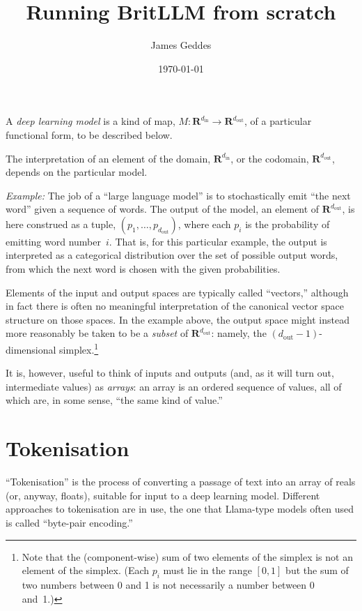 \documentclass[11pt, a4paper]{article}
\title{Running BritLLM from scratch}
\author{James Geddes}
\date{\today}
\newcommand{\setR}{\mathbold{R}}
\begin{document}
\maketitle

A \emph{deep learning model} is a kind of map,
$M\colon \setR^{d_\text{in}} \to \setR^{d_\text{out}}$, of a particular
functional form, to be described below.

The interpretation of an element of the domain, $\setR^{d_\text{in}}$,
or the codomain, $\setR^{d_\text{out}}$, depends on the particular
model.

\emph{Example:} The job of a ``large language model'' is to
stochastically emit ``the next word'' given a sequence of words. The
output of the model, an element of $\setR^{d_\text{out}}$, is here
construed as a tuple, $(p_1, \dotsc, p_{d_\text{out}})$, where each
$p_i$ is the probability of emitting word number~$i$. That is, for
this particular example, the output is interpreted as a categorical
distribution over the set of possible output words, from which the
next word is chosen with the given probabilities.

Elements of the input and output spaces are typically called
``vectors,'' although in fact there is often no meaningful
interpretation of the canonical vector space structure on those
spaces. In the example above, the output space might instead more
reasonably be taken to be a \emph{subset} of $\setR^{d_\text{out}}$:
namely, the $(d_\text{out}-1)$-dimensional simplex.\footnote{Note that
  the (component-wise) sum of two elements of the simplex is not an
  element of the simplex. (Each $p_i$ must lie in the range $[0,1]$
  but the sum of two numbers between 0 and 1 is not necessarily a
  number between 0 and~1.)}

It is, however, useful to think of inputs and outputs (and, as it will
turn out, intermediate values) as \emph{arrays}: an array is an
ordered sequence of values, all of which are, in some sense, ``the
same kind of value.''

\section{Tokenisation}

``Tokenisation'' is the process of converting a passage of text into
an array of reals (or, anyway, floats), suitable for input to a deep
learning model. Different approaches to tokenisation are in use, the
one that Llama-type models often used is called ``byte-pair
encoding.''
\end{document}
